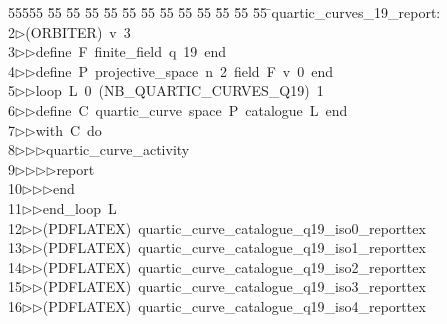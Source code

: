 %
%
\begin{tabbing}
55555 \= 55 \= 55 \= 55 \= 55 \= 55 \= 55 \= 55 \= 55 \= 55 \= 55 \= 55 \= 55 \= \>quartic\_curves\_19\_report:\ \\[0pt]
2\>$\triangleright$\>(ORBITER)\ v\ 3\ \\[0pt]
3\>$\triangleright$\>$\triangleright$\>define\ F\ finite\_field\ q\ 19\ end\ \\[0pt]
4\>$\triangleright$\>$\triangleright$\>define\ P\ projective\_space\ n\ 2\ field\ F\ v\ 0\ end\ \\[0pt]
5\>$\triangleright$\>$\triangleright$\>loop\ L\ 0\ (NB\_QUARTIC\_CURVES\_Q19)\ 1\ \\[0pt]
6\>$\triangleright$\>$\triangleright$\>define\ C\ quartic\_curve\ space\ P\ catalogue\ L\ end\ \\[0pt]
7\>$\triangleright$\>$\triangleright$\>with\ C\ do\ \\[0pt]
8\>$\triangleright$\>$\triangleright$\>$\triangleright$\>quartic\_curve\_activity\ \\[0pt]
9\>$\triangleright$\>$\triangleright$\>$\triangleright$\>$\triangleright$\>report\ \\[0pt]
10\>$\triangleright$\>$\triangleright$\>$\triangleright$\>end\ \\[0pt]
11\>$\triangleright$\>$\triangleright$\>end\_loop\ L\\[0pt]
12\>$\triangleright$\>$\triangleright$\>(PDFLATEX)\ quartic\_curve\_catalogue\_q19\_iso0\_reporttex\\[0pt]
13\>$\triangleright$\>$\triangleright$\>(PDFLATEX)\ quartic\_curve\_catalogue\_q19\_iso1\_reporttex\\[0pt]
14\>$\triangleright$\>$\triangleright$\>(PDFLATEX)\ quartic\_curve\_catalogue\_q19\_iso2\_reporttex\\[0pt]
15\>$\triangleright$\>$\triangleright$\>(PDFLATEX)\ quartic\_curve\_catalogue\_q19\_iso3\_reporttex\\[0pt]
16\>$\triangleright$\>$\triangleright$\>(PDFLATEX)\ quartic\_curve\_catalogue\_q19\_iso4\_reporttex\\[0pt]

\end{tabbing}
